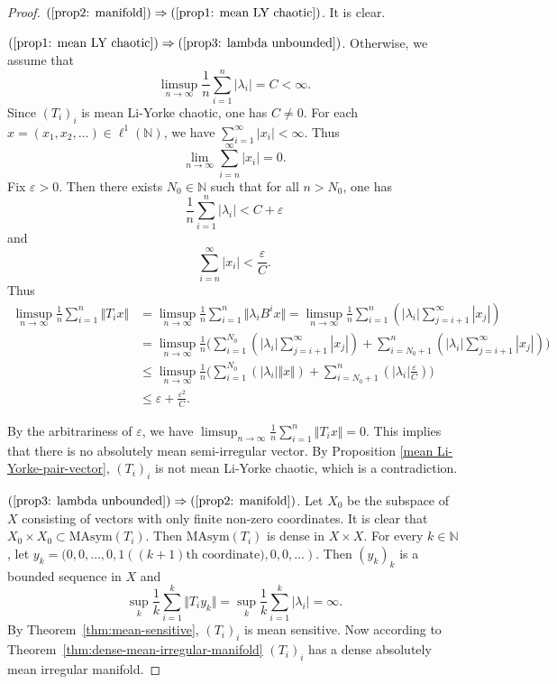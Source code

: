 \documentclass[12pt,a4paper]{amsart}
\theoremstyle{definition}
\theoremstyle{plain}
\begin{document}
\begin{proof}
     $(\ref{prop2: manifold})  \Rightarrow  (\ref{prop1: mean LY chaotic})$. It is clear.

     $(\ref{prop1: mean LY chaotic})  \Rightarrow (\ref{prop3: lambda unbounded}) $. 
    Otherwise, we assume that
    \[
        \limsup_{n\to\infty} \frac{1}{n} \sum_{i=1}^n |\lambda_i|=C<\infty.
    \]
    Since $(T_i)_i$ is mean Li-Yorke chaotic, one has $C\neq 0$.
    For each $x=(x_1, x_2, \ldots)\in \ell^1(\mathbb{N})$, we have $\sum_{i=1}^{\infty}|x_i|<\infty$.
    Thus
    \[
        \lim_{n\to \infty} \sum_{i=n}^{\infty} |x_i|=0.
    \]
    Fix $\varepsilon >0$.
    Then there exists $N_0\in \mathbb{N}$ such that for all $n>N_0$, one has
    \[
        \frac{1}{n} \sum_{i=1}^n |\lambda_i|<C+\varepsilon
    \]
    and
    \[
        \sum_{i=n}^{\infty} |x_i|<\frac{\varepsilon}{C}.
    \]
    Thus
    \begin{align*}
        \limsup_{n\to \infty}\frac{1}{n} \sum_{i=1}^n \Vert T_ix \Vert
         & =\limsup_{n\to \infty}\frac{1}{n} \sum_{i=1}^n \Vert \lambda_i B^ix \Vert
        =\limsup_{n\to \infty}\frac{1}{n} \sum_{i=1}^n (|\lambda_i| \sum_{j=i+1}^{\infty} |x_j| ) \\
         & =\limsup_{n\to \infty}\frac{1}{n} \biggr(\sum_{i=1}^{N_0} (|\lambda_i| \sum_{j=i+1}^{\infty} |x_j| )+\sum_{i=N_0+1}^{n} (|\lambda_i| \sum_{j=i+1}^{\infty} |x_j| ) \biggr)   \\
         & \le \limsup_{n\to \infty}\frac{1}{n} \biggr(\sum_{i=1}^{N_0} ( |\lambda_i| \Vert x\Vert)   +\sum_{i=N_0+1}^{n} (|\lambda_i| \frac{\varepsilon}{C} ) \biggr) \\ 
         &\le  \varepsilon+ \frac{\varepsilon^2}{C}.
    \end{align*}

    By the arbitrariness of $\varepsilon$, we have $\limsup_{n\to \infty}\frac{1}{n} \sum_{i=1}^n \Vert T_ix \Vert=0$.
    This implies that there is no absolutely mean semi-irregular vector.
    By Proposition \ref{mean Li-Yorke-pair-vector},
    $(T_i)_{i}$ is not mean Li-Yorke chaotic, which is a contradiction.

    $(\ref{prop3: lambda unbounded})  \Rightarrow (\ref{prop2: manifold})$. 
    Let $X_0$ be the subspace of $X$ consisting of vectors with only finite non-zero coordinates. It is clear that $X_0\times X_0\subset \textrm{MAsym}(T_i)$. Then $\textrm{MAsym}(T_i)$ is dense in $X\times X$.
    For every $k\in\mathbb{N}$, let $y_k=(0,0,\dotsc,0,1 ((k+1)\text{th coordinate)},0,0,\dotsc)$.
    Then $(y_k)_k$ is a bounded sequence in $X$ and
    \[
        \sup_{k}\frac{1}{k}\sum_{i=1}^k \Vert T_i y_k\Vert =
        \sup_{k}\frac{1}{k}\sum_{i=1}^k |\lambda_i|=\infty.
    \]
    By Theorem~\ref{thm:mean-sensitive}, $(T_i)_i$ is mean sensitive.
    Now according to Theorem~\ref{thm:dense-mean-irregular-manifold} $(T_i)_i$ has a dense absolutely mean irregular manifold.
\end{proof}
\end{document}
